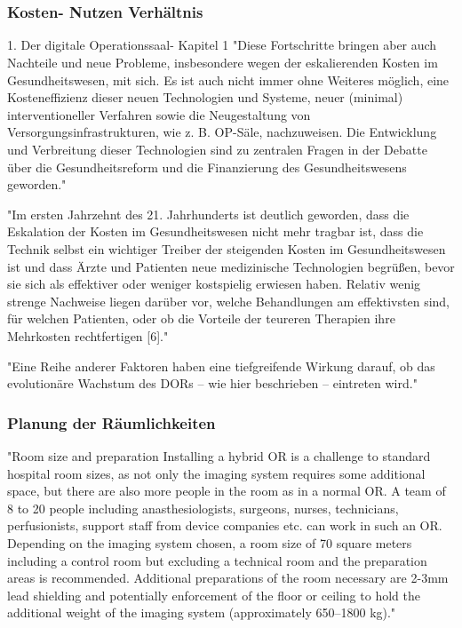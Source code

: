 \chapter{}
\label{sec:overview}

\subsection{Kosten- Nutzen Verhältnis}
1. Der digitale Operationssaal- Kapitel 1
	"Diese Fortschritte bringen aber auch Nachteile und neue Probleme, insbesondere
	wegen der eskalierenden Kosten im Gesundheitswesen, mit sich. Es ist auch nicht
	immer ohne Weiteres möglich, eine Kosteneffizienz dieser neuen Technologien und
	Systeme, neuer (minimal) interventioneller Verfahren sowie die Neugestaltung von
	Versorgungsinfrastrukturen, wie z. B. OP-Säle, nachzuweisen. Die Entwicklung und
	Verbreitung dieser Technologien sind zu zentralen Fragen in der Debatte über die
	Gesundheitsreform und die Finanzierung des Gesundheitswesens geworden."
	
	"Im ersten Jahrzehnt des 21. Jahrhunderts ist deutlich geworden, dass die Eskalation
	der Kosten im Gesundheitswesen nicht mehr tragbar ist, dass die Technik selbst
	ein wichtiger Treiber der steigenden Kosten im Gesundheitswesen ist und dass Ärzte
	und Patienten neue medizinische Technologien begrüßen, bevor sie sich als effektiver
	oder weniger kostspielig erwiesen haben. Relativ wenig strenge Nachweise liegen
	darüber vor, welche Behandlungen am effektivsten sind, für welchen Patienten, oder
	ob die Vorteile der teureren Therapien ihre Mehrkosten rechtfertigen [6]."
	
	"Eine Reihe anderer Faktoren haben eine tiefgreifende Wirkung
	darauf, ob das evolutionäre Wachstum des DORs – wie hier beschrieben – eintreten
	wird."


\subsection{Planung der Räumlichkeiten}
	"Room size and preparation
	Installing a hybrid OR is a challenge to standard hospital room sizes, as not only the imaging system requires some additional space, but there are also more people in the room as in a normal OR. A team of 8 to 20 people including anasthesiologists, surgeons, nurses, technicians, perfusionists, support staff from device companies etc. can work in such an OR. Depending on the imaging system chosen, a room size of 70 square meters including a control room but excluding a technical room and the preparation areas is recommended. Additional preparations of the room necessary are 2-3mm lead shielding and potentially enforcement of the floor or ceiling to hold the additional weight of the imaging system (approximately 650–1800 kg)."
	
